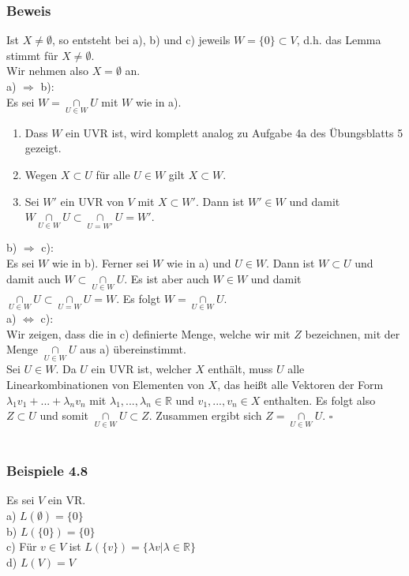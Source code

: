 \documentclass{article}
\begin{document}
\subsubsection*{Beweis}
Ist $X \neq \emptyset$, so entsteht bei a), b) und c) jeweils $W = \{0\} \subset V$, d.h. das Lemma stimmt für $X \neq \emptyset$. \\
Wir nehmen also $X = \emptyset$ an. \\
a) $\Rightarrow$ b): \\
Es sei $W = \underset{U \in W}{\cap} U$ mit $W$ wie in a).
\begin{enumerate}
    \item Dass $W$ ein UVR ist, wird komplett analog zu Aufgabe 4a des Übungsblatts 5 gezeigt.
    \item Wegen $X \subset U$ für alle $U \in W$ gilt $X \subset W$.
    \item Sei $W'$ ein UVR von $V$ mit $X \subset W'$. Dann ist $W' \in W$ und damit $W \underset{U \in W}{\cap} U \subset \underset{U = W'}{\cap} U = W'$. \\
\end{enumerate}
b) $\Rightarrow$ c): \\
Es sei $W$ wie in b). Ferner sei $W$ wie in a) und $U \in W$. Dann ist $W \subset U$ und damit auch $W \subset \underset{U \in W}{\cap} U$. Es ist aber auch $W \in W$ und damit $\underset{U \in W}{\cap} U \subset \underset{U = W}{\cap} U = W$. Es folgt $W = \underset{U \in W}{\cap} U$. \\
a) $\Leftrightarrow$ c): \\
Wir zeigen, dass die in c) definierte Menge, welche wir mit $Z$ bezeichnen, mit der Menge $\underset{U \in W}{\cap} U$ aus a) übereinstimmt. \\
Sei $U \in W$. Da $U$ ein UVR ist, welcher $X$ enthält, muss $U$ alle Linearkombinationen von Elementen von $X$, das heißt alle Vektoren der Form $\lambda_1 v_1 + ... + \lambda_n v_n$ mit $\lambda_1,...,\lambda_n \in \mathbb{R}$ und $v_1,...,v_n \in X$ enthalten. Es folgt also $Z \subset U$ und somit $\underset{U \in W}{\cap} U \subset Z$.  
Zusammen ergibt sich $Z = \underset{U \in W}{\cap} U$. $\square$ \\
\\
\subsubsection*{Beispiele 4.8}
Es sei $V$ ein VR. \\
a) $L(\emptyset) = \{0\}$ \\
b) $L(\{0\}) = \{0\}$ \\
c) Für $v \in V$ ist $L(\{v\}) = \{\lambda v | \lambda \in \mathbb{R}\}$ \\
d) $L(V) = V$
\\
\end{document}
